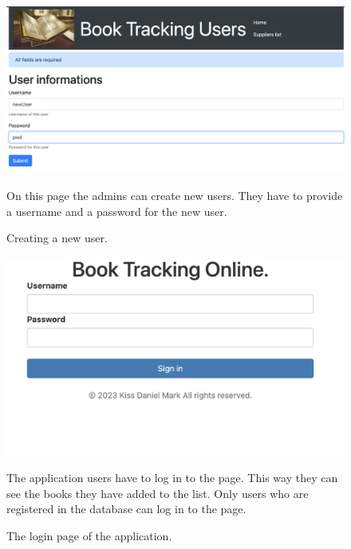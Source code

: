 \documentclass[11pt,a4paper,oneside]{report}
\begin{document}
\begin{figure}[!ht]
  \begin{center}
    \includegraphics[scale=0.3]{admin_create.png}
    \caption{Creating a new user.}
    \label{fig:TexnicCenter}
  \end{center}
  On this page the admins can create new users. They have to provide a username and a password for the new user.
\end{figure}


\begin{figure}[!ht]
  \begin{center}
    \includegraphics[scale=0.3]{frontend-login.png}
    \caption{The login page of the application.}
    \label{fig:TexnicCenter}
  \end{center}
  The application users have to log in to the page. This way they can see the books they have added to the list. Only users who are registered in the database can log in to the page.
\end{figure}
\end{document}

